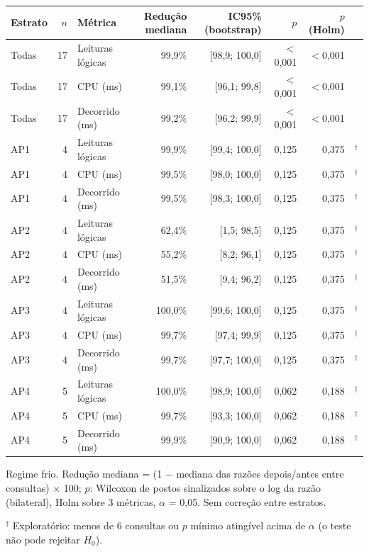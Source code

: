 {\small\setlength{\tabcolsep}{4pt}
\begin{tabular}{lrlrrrrl}
\toprule
Estrato & $n$ & Métrica & Redução mediana & IC95\% (bootstrap) & $p$ & $p$ (Holm) &  \\
\midrule
Todas & 17 & Leituras lógicas & 99,9\% & [98,9; 100,0] & $<$0,001 & $<$0,001 &  \\
Todas & 17 & CPU (ms) & 99,1\% & [96,1; 99,8] & $<$0,001 & $<$0,001 &  \\
Todas & 17 & Decorrido (ms) & 99,2\% & [96,2; 99,9] & $<$0,001 & $<$0,001 &  \\
\midrule
AP1 & 4 & Leituras lógicas & 99,9\% & [99,4; 100,0] & 0,125 & 0,375 & $^{\dagger}$ \\
AP1 & 4 & CPU (ms) & 99,5\% & [98,0; 100,0] & 0,125 & 0,375 & $^{\dagger}$ \\
AP1 & 4 & Decorrido (ms) & 99,5\% & [98,3; 100,0] & 0,125 & 0,375 & $^{\dagger}$ \\
\midrule
AP2 & 4 & Leituras lógicas & 62,4\% & [1,5; 98,5] & 0,125 & 0,375 & $^{\dagger}$ \\
AP2 & 4 & CPU (ms) & 55,2\% & [8,2; 96,1] & 0,125 & 0,375 & $^{\dagger}$ \\
AP2 & 4 & Decorrido (ms) & 51,5\% & [9,4; 96,2] & 0,125 & 0,375 & $^{\dagger}$ \\
\midrule
AP3 & 4 & Leituras lógicas & 100,0\% & [99,6; 100,0] & 0,125 & 0,375 & $^{\dagger}$ \\
AP3 & 4 & CPU (ms) & 99,7\% & [97,4; 99,9] & 0,125 & 0,375 & $^{\dagger}$ \\
AP3 & 4 & Decorrido (ms) & 99,7\% & [97,7; 100,0] & 0,125 & 0,375 & $^{\dagger}$ \\
\midrule
AP4 & 5 & Leituras lógicas & 100,0\% & [98,9; 100,0] & 0,062 & 0,188 & $^{\dagger}$ \\
AP4 & 5 & CPU (ms) & 99,7\% & [93,3; 100,0] & 0,062 & 0,188 & $^{\dagger}$ \\
AP4 & 5 & Decorrido (ms) & 99,9\% & [90,9; 100,0] & 0,062 & 0,188 & $^{\dagger}$ \\
\bottomrule
\end{tabular}\par
\vspace{3pt}
\begin{minipage}{\linewidth}\footnotesize
Regime frio. Redução mediana = (1 $-$ mediana das razões depois/antes entre consultas) $\times$ 100; $p$: Wilcoxon de postos sinalizados sobre o log da razão (bilateral), Holm sobre 3 métricas, $\alpha$ = 0,05. Sem correção entre estratos.\par
$^{\dagger}$ Exploratório: menos de 6 consultas ou $p$ mínimo atingível acima de $\alpha$ (o teste não pode rejeitar $H_0$).
\end{minipage}
}
